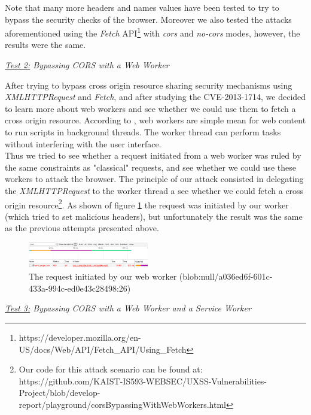 \documentclass[journal]{IEEEtran}
\begin{document}
Note that many more headers and names values have been tested to try to bypass the security checks of the browser. Moreover we also tested the attacks aforementioned using the \emph{Fetch} API\footnote{https://developer.mozilla.org/en-US/docs/Web/API/Fetch\_API/Using\_Fetch} with \emph{cors} and \emph{no-cors} modes, however, the results were the same.

\medskip

\emph{\underline{Test 2:} Bypassing CORS with a Web Worker}

After trying to bypass cross origin resource sharing security mechanisms using \emph{XMLHTTPRequest} and \emph{Fetch}, and after studying the CVE-2013-1714, we decided to learn more about web workers and see whether we could use them to fetch a cross origin resource. According to \cite{webWorkers}, web workers are simple mean for web content to run scripts in background threads. The worker thread can perform tasks without interfering with the user interface. \\
Thus we tried to see whether a request initiated from a web worker was ruled by the same constraints as "classical" requests, and see whether we could use these workers to attack the browser. The principle of our attack consisted in delegating the \emph{XMLHTTPRequest} to the worker thread a see whether we could fetch a cross origin resource\footnote{Our code for this attack scenario can be found at: https://github.com/KAIST-IS593-WEBSEC/UXSS-Vulnerabilities-Project/blob/develop-report/playground/corsBypassingWithWebWorkers.html}. As shown of figure \ref{fig:corsWithWebWorkers} the request was initiated by our worker (which tried to set malicious headers), but unfortunately the result was the same as the previous attempts presented above. 

\begin{figure}[h]
\centering
\includegraphics[width=0.47\textwidth]{images/corsWithWebWorkers.png}
\caption{The request initiated by our web worker (blob:null/a036ed6f-601c-433a-994c-ed0e43c28498:26)}
\label{fig:corsWithWebWorkers}
\end{figure}


\medskip

\emph{\underline{Test 3:} Bypassing CORS with a Web Worker and a Service Worker}
\end{document}
